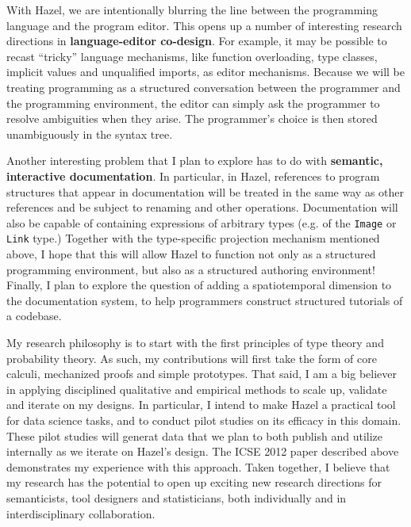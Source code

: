 \documentclass[9pt]{extarticle}
\let\li\lstinline
\begin{document}
With Hazel, we are intentionally blurring the line between the programming language and the program editor. This opens up a number of interesting research directions in \textbf{language-editor co-design}. For example, it may be possible to recast  ``tricky'' language mechanisms, like function overloading, type classes, implicit values and unqualified imports, as editor mechanisms. Because we will be treating programming as a structured conversation between the programmer and the programming environment, the editor can simply ask the programmer to resolve ambiguities when they arise. The programmer's choice is then stored unambiguously in the syntax tree. %

Another interesting problem that I plan to explore has to do with \textbf{semantic, interactive documentation}. In particular, in Hazel, references to program structures that appear in documentation will be treated in the same way as other references and be subject to renaming and other operations. Documentation will also be capable of containing expressions of arbitrary types (e.g. of the \li{Image} or \li{Link} type.) Together with the type-specific projection mechanism mentioned above, I hope that this will allow Hazel to function not only as a structured programming environment, but also as a structured authoring environment! Finally, I plan to explore the question of adding a spatiotemporal dimension to the documentation system, to help programmers construct structured tutorials of a codebase.

My research philosophy is to start with the first principles of type theory and probability theory. As such, my contributions will first take the form of core calculi, mechanized proofs and simple prototypes. That said, I am a big believer in applying disciplined qualitative and empirical methods to scale up, validate and iterate on my designs. In particular, I intend to make Hazel a practical tool for data science tasks, and to conduct pilot studies on its efficacy in this domain. These pilot studies will generat data that we plan to both publish and utilize internally as we iterate on Hazel's design. The ICSE 2012 paper described above demonstrates my experience with this approach. Taken together, I believe that my research has the potential to open up exciting new research directions for semanticists, tool designers and statisticians, both individually and in interdisciplinary collaboration. %


 
\end{document}
